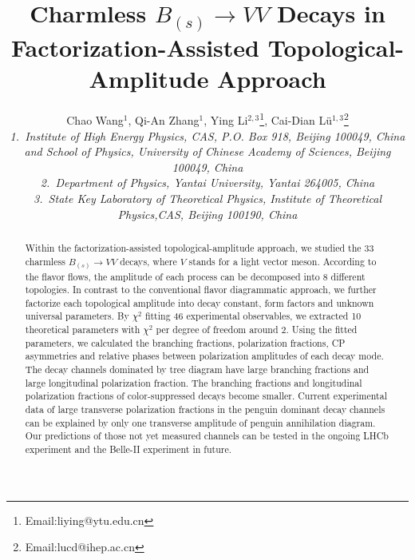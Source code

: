 \documentclass[11pt]{article}
\begin{document}
\title{Charmless  $B_{(s)}\to VV$ Decays in Factorization-Assisted Topological-Amplitude Approach}
\author{ Chao Wang$^{1}$, Qi-An Zhang$^{1}$, Ying Li$^{2,3}$\footnote{Email:liying@ytu.edu.cn},
Cai-Dian L\"u$^{1,3}$\footnote{Email:lucd@ihep.ac.cn}\\
{\small \it 1.~Institute of High Energy Physics, CAS, P.O. Box 918, Beijing 100049, China  }\\
{\small \it and School of Physics, University of Chinese Academy of Sciences, Beijing 100049, China} \\
{\small \it 2.~Department of Physics, Yantai University, Yantai 264005, China}\\
{\small \it 3.~State Key Laboratory of Theoretical Physics, Institute of Theoretical Physics,CAS, Beijing 100190, China}
}
\maketitle
\begin{abstract}
Within the factorization-assisted topological-amplitude approach, we studied the 33 charmless $B_{(s)} \to VV$   decays, where $V$ stands for a light vector meson. According to the flavor flows, the amplitude of each process can be decomposed into 8 different topologies. In contrast to the conventional flavor diagrammatic approach, we further factorize each topological amplitude into decay constant, form factors and unknown universal parameters. By  $\chi^2$ fitting  46 experimental observables, we extracted   10 theoretical  parameters with $\chi^2$ per degree of freedom around 2. Using the fitted parameters, we calculated the branching fractions, polarization fractions, CP asymmetries and relative phases between polarization amplitudes of each decay mode.  The decay channels dominated by tree diagram have large branching fractions and large longitudinal polarization fraction. The branching fractions and longitudinal polarization fractions  of color-suppressed decays become smaller. %
Current experimental data of large transverse polarization fractions in the penguin dominant decay channels can be explained by only one transverse amplitude of penguin annihilation diagram. Our predictions of those not yet measured channels can be tested in the ongoing LHCb experiment and the Belle-II experiment in future.
\end{abstract}
\end{document}
